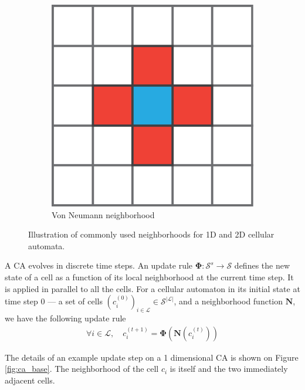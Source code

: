 \begin{figure}[htbp]
\begin{subfigure}[c]{.3\linewidth}
    \includegraphics[width=\linewidth]{figures/von_neumann}
    \caption{Von Neumann neighborhood}
    \label{fig:von_neumann}
  \end{subfigure}

  \caption{Illustration of commonly used neighborhoods for 1D and 2D cellular automata.}
  \label{fig:neighborhoods}
\end{figure}

A \ac{CA} evolves in discrete time steps. An update rule
$\boldsymbol{\Phi}: \mathcal{S}^{s} \rightarrow \mathcal{S}$ defines the new state of a cell as a
function of its local neighborhood at the current time step. It is applied in
parallel to all the cells. For a cellular automaton in its initial state at time
step 0 --- \ie a set of cells $\left(c_{i}^{(0)}\right)_{i \in \mathcal{L}} \in \mathcal{S}^{|\mathcal{L}|}$, and a
neighborhood function $\boldsymbol{N}$, we have the following update rule
\begin{equation}
\begin{aligned}
\forall i \in \mathcal{L}, \quad c_{i}^{(t + 1)} = \boldsymbol{\Phi}\left(\boldsymbol{N}\left(c_{i}^{(t)}\right)\right)
\end{aligned}
\end{equation}

The details of an example update step on a 1 dimensional \ac{CA} is shown on
Figure \ref{fig:ca_base}. The neighborhood of the cell $c_{i}$ is itself and the
two immediately adjacent cells.

